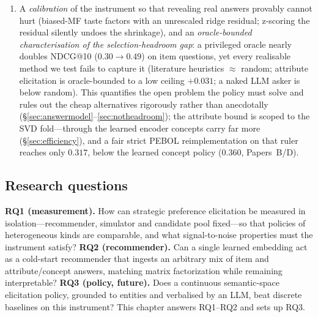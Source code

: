 \documentclass[11pt]{article}
\begin{document}
\begin{enumerate}[leftmargin=1.4em,itemsep=1pt]
        open-vocab, inference-time fold-in.
  \item A \emph{calibration} of the instrument so that revealing real answers provably cannot hurt (biased-MF taste
        factors with an unrescaled ridge residual; z-scoring the residual silently undoes the shrinkage), and an
        \emph{oracle-bounded characterisation of the selection-headroom gap}: a privileged oracle nearly doubles
        NDCG@10 ($0.30\!\to\!0.49$) on item questions, yet every realisable method we test fails to capture it
        (literature heuristics $\approx$ random; attribute elicitation is oracle-bounded to a low ceiling
        $+0.031$; a naked LLM asker is below random). This quantifies the open problem the policy must solve and
        rules out the cheap alternatives rigorously rather than anecdotally (\S\ref{sec:answermodel}--\ref{sec:notheadroom});
        the attribute bound is scoped to the SVD fold---through the learned encoder concepts carry far more
        (\S\ref{sec:efficiency}), and a fair strict PEBOL reimplementation on that ruler reaches only $0.317$,
        below the learned concept policy ($0.360$, Papers~B/D).
\end{enumerate}

\subsection{Research questions}
\textbf{RQ1 (measurement).} How can strategic preference elicitation be measured in isolation---recommender,
simulator and candidate pool fixed---so that policies of heterogeneous kinds are comparable, and what
signal-to-noise properties must the instrument satisfy? \textbf{RQ2 (recommender).} Can a single learned
embedding act as a cold-start recommender that ingests an arbitrary mix of item and attribute/concept answers,
matching matrix factorization while remaining interpretable? \textbf{RQ3 (policy, future).} Does a continuous
semantic-space elicitation policy, grounded to entities and verbalised by an LLM, beat discrete baselines on this
instrument? This chapter answers RQ1--RQ2 and sets up RQ3.
\end{document}
